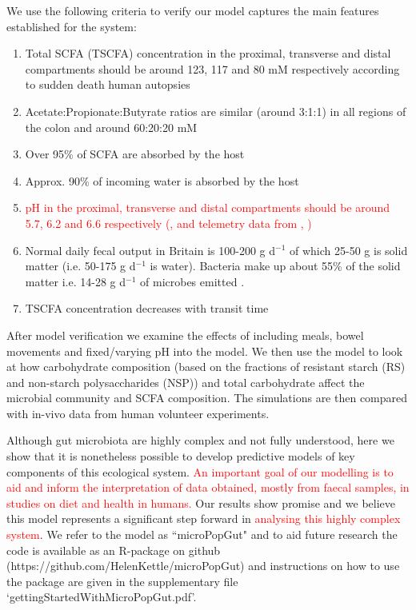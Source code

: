 \documentclass[a4paper]{article}
\begin{document}
We use the following criteria to verify our model captures the main features established for the system:
\begin{enumerate}
\item Total SCFA (TSCFA) concentration in the proximal, transverse and distal compartments should be around 123, 117 and 80 mM respectively according to sudden death human autopsies \citep{cummings} 
\item Acetate:Propionate:Butyrate ratios are similar (around 3:1:1) in all regions of the colon and around 60:20:20 mM \citep{cummings}
\item Over 95\% of SCFA are absorbed by the host \citep{Topping}
\item Approx. 90\% of incoming water is absorbed by the host \citep{Phillips} 
\item \textcolor{red}{pH in the proximal, transverse and distal compartments should be around 5.7, 6.2 and 6.6 respectively (\cite{cummings}, and telemetry data from \cite{miko}, \cite{bown1974})}
\item Normal daily fecal output in Britain is 100-200 g d$^{-1}$ of which 25-50 g is solid matter (i.e. 50-175 g d$^{-1}$ is water). Bacteria make up about 55\% of the solid matter i.e. 14-28 g d$^{-1}$ of microbes emitted \citep{StephenCummings}.
\item TSCFA concentration decreases with transit time \citep{Lewis}
\end{enumerate}
After model verification we examine the effects of including meals, bowel movements and fixed/varying pH into the model. We then use the model to look at how carbohydrate composition (based on the fractions of resistant starch (RS) and non-starch polysaccharides (NSP)) and total carbohydrate affect the microbial community and SCFA composition. The simulations are then compared with in-vivo data from human volunteer experiments. 

Although gut microbiota are highly complex and not fully understood, here we show that it is nonetheless possible to develop predictive models of key components of this ecological system. 
\textcolor{red}{An important goal of our modelling is to aid and inform the interpretation of data obtained, mostly from faecal samples, in studies on diet and health in humans.}
Our results show promise and we believe this model represents a significant step forward in \textcolor{red}{analysing this highly complex system}. 
We refer to the model as ``microPopGut" and to aid future research the code is available as an R-package on github (https://github.com/HelenKettle/microPopGut) and instructions on how to use the package are given in the supplementary file `gettingStartedWithMicroPopGut.pdf'.
\end{document}
